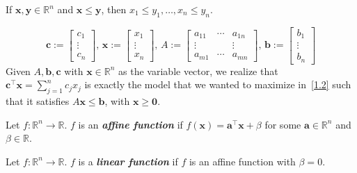 \begin{remark}
    If $\bm{x},\bm{y}\in\mathbb{R}^n$ and $\bm{x}\leqslant \bm{y}$, then
    $x_1\leqslant  y_1, \ldots, x_n\leqslant y_n$.
\end{remark}

\begin{remark}
    \[
        \bm{c}:=\left[\begin{array}{c}{c_{1}} \\ {\vdots} \\ {c_{n}}\end{array}\right],\,
        \bm{x}:=\left[\begin{array}{c}{x_{1}} \\ {\vdots} \\ {x_{n}}\end{array}\right],\,
        A:=\left[\begin{array}{cccc}
                {a_{11}}  & \cdots & {a_{1 n}} \\
                \vdots    &        & \vdots    \\
                {a_{m 1}} & \cdots & {a_{m n}}
            \end{array}\right]
        ,\,
        \bm{b}:=\left[\begin{array}{c}{b_{1}} \\ {\vdots} \\ {b_{n}}\end{array}\right]
    \]
    Given $A,\bm{b},\bm{c}$ with $\bm{x}\in\mathbb{R}^n$ as the variable vector, we realize that
    $\bm{c}^\top  \bm{x}=\sum\limits_{j=1}^n c_j x_j$ is exactly the model that we wanted to maximize
    in~\ref{1.2} such that it satisfies $A\bm{x}\leqslant \bm{b}$, with $\bm{x}\geqslant  \bm{0}$.
\end{remark}

\begin{defbox}
    \begin{definition}
        Let $f:\mathbb{R}^n\rightarrow\mathbb{R}$. $f$ is an \textbf{\emph{affine function}} if
        $f(\bm{x})=\bm{a}^\top \bm{x}+\beta$ for some $\bm{a}\in\mathbb{R}^n$ and $\beta\in\mathbb{R}$.
    \end{definition}
\end{defbox}

\begin{defbox}
    \begin{definition}
        Let $f:\mathbb{R}^n\rightarrow\mathbb{R}$. $f$ is a \textbf{\emph{linear function}} if
        $f$ is an affine function with $\beta=0$.
    \end{definition}
\end{defbox}

